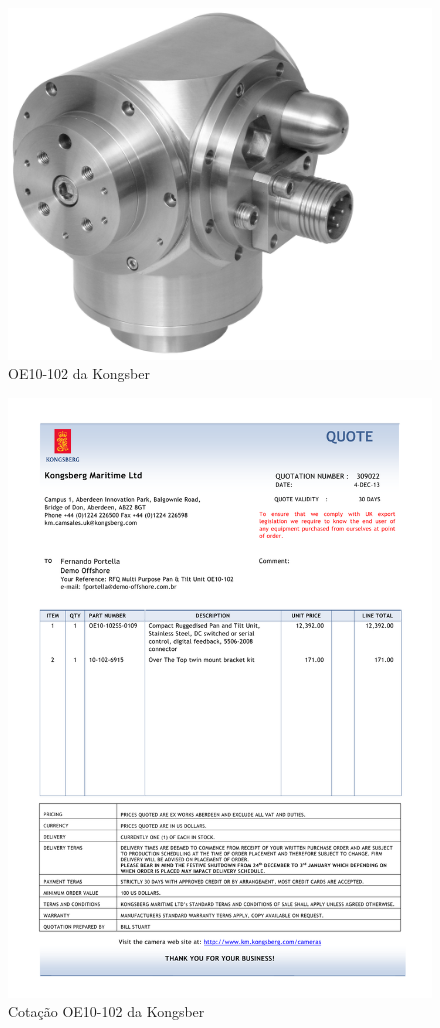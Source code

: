 \begin{figure}[h!]
 \centering
 \includegraphics[width=0.3\columnwidth]{Pan_Tilt/foto}
 \caption{OE10-102 da Kongsber}
  
\end{figure}



\begin{figure}[h!]
\centering
\includegraphics[width=1\columnwidth]{Pan_Tilt/price_quote_0.pdf}
\caption{Cotação OE10-102 da Kongsber  } 
\end{figure}

